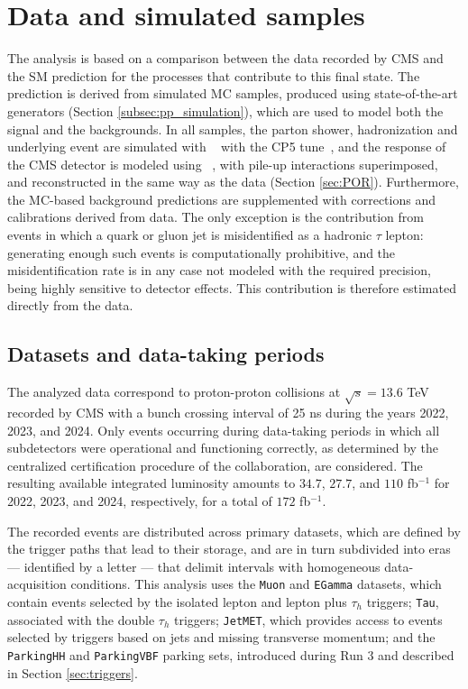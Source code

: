 \section{Data and simulated samples}
\label{sec:bbtt_samples}
The analysis is based on a comparison between the data recorded by CMS and the SM prediction for the processes that contribute to this final state. The prediction is derived from simulated MC samples, produced using state-of-the-art generators (Section \ref{subsec:pp_simulation}), which are used to model both the signal and the backgrounds. In all samples, the parton shower, hadronization and underlying event are simulated with ~\cite{Bierlich:2022pfr} with the CP5 tune~\cite{CMS:2019csb}, and the response of the CMS detector is modeled using \GEANT~\cite{GEANT4:2002zbu}, with pile-up interactions superimposed, and reconstructed in the same way as the data (Section \ref{sec:POR}). Furthermore, the MC-based background predictions are supplemented with corrections and calibrations derived from data. The only exception is the contribution from events in which a quark or gluon jet is misidentified as a hadronic $\tau$ lepton: generating enough such events is computationally prohibitive, and the misidentification rate is in any case not modeled with the required precision, being highly sensitive to detector effects. This contribution is therefore estimated directly from the data.

\subsection{Datasets and data-taking periods}
%
The analyzed data correspond to proton-proton collisions at $\sqrt{s} = 13.6$ TeV recorded by CMS with a bunch crossing interval of 25 ns during the years 2022, 2023, and 2024. Only events occurring during data-taking periods in which all subdetectors were operational and functioning correctly, as determined by the centralized certification procedure of the collaboration, are considered. The resulting available integrated luminosity amounts to $34.7$, $27.7$, and $110$ fb$^{-1}$ for 2022, 2023, and 2024, respectively, for a total of $172$ fb$^{-1}$.

The recorded events are distributed across primary datasets, which are defined by the trigger paths that lead to their storage, and are in turn subdivided into eras — identified by a letter — that delimit intervals with homogeneous data-acquisition conditions. This analysis uses the \texttt{Muon} and \texttt{EGamma} datasets, which contain events selected by the isolated lepton and lepton plus $\tau_h$ triggers; \texttt{Tau}, associated with the double $\tau_h$ triggers; \texttt{JetMET}, which provides access to events selected by triggers based on jets and missing transverse momentum; and the \texttt{ParkingHH} and \texttt{ParkingVBF} parking sets, introduced during Run 3 and described in Section \ref{sec:triggers}.

